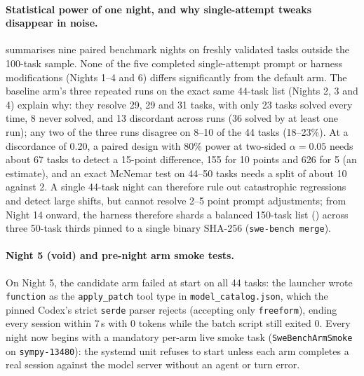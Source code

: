 \documentclass[11pt]{article}
\newcommand{\code}[1]{\texttt{#1}}
\begin{document}
\paragraph{Statistical power of one night, and why single-attempt tweaks disappear in noise.}
 summarises nine paired benchmark nights on freshly validated tasks outside the
100-task sample. None of the five completed single-attempt prompt or harness modifications (Nights
1--4 and 6) differs significantly from the default arm. The baseline arm's three repeated runs on
the exact same 44-task list (Nights 2, 3 and 4) explain why: they resolve 29, 29 and 31 tasks, with
only 23 tasks solved every time, 8 never solved, and 13 discordant across runs (36 solved by at
least one run); any two of the three runs disagree on 8--10 of the 44 tasks (18--23\%). At a
discordance of 0.20, a paired design with 80\% power at two-sided $\alpha = 0.05$ needs about 67
tasks to detect a 15-point difference, 155 for 10 points and 626 for 5 (an estimate), and an exact
McNemar test on 44--50 tasks needs a split of about 10 against 2. A single 44-task night can therefore rule out catastrophic
regressions and detect large shifts, but cannot resolve 2--5 point prompt adjustments; from Night 14
onward, the harness therefore shards a balanced 150-task list () across three
50-task thirds pinned to a single binary SHA-256 (\code{swe-bench merge}).

\paragraph{Night 5 (void) and pre-night arm smoke tests.} On Night 5, the candidate arm failed at
start on all 44 tasks: the launcher wrote \code{function} as the \code{apply\_patch} tool type in
\code{model\_catalog.json}, which the pinned Codex's strict \code{serde} parser rejects (accepting
only \code{freeform}), ending every session within 7\,s with 0 tokens while the batch script still
exited 0. Every night now begins with a mandatory per-arm live smoke task (\code{SweBenchArmSmoke}
on \code{sympy-13480}): the systemd unit refuses to start unless each arm completes a real session
against the model server without an agent or turn error.
\end{document}
